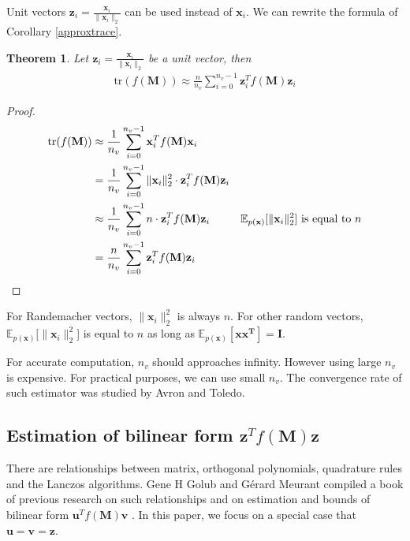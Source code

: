 \documentclass[senior,final,11pt]{iscs-thesis}
\newtheorem{theorem}{Theorem}
\begin{document}
Unit vectors $\mathbf{z}_i = \frac{\mathbf{x}_i}{\|\mathbf{x}_i\|_2}$ can be used instead of $\mathbf{x}_i$. We can rewrite the formula of Corollary \ref{approxtrace}.
\begin{theorem}
    \label{approxtraceUniformed}
    Let $\mathbf{z}_i = \frac{\mathbf{x}_i}{\|\mathbf{x}_i\|_2}$ be a unit vector, then
    \begin{align*}
        \mathrm{tr}(f(\mathbf{M})) \approx \frac{n}{n_v}\sum_{i=0}^{n_v-1} \mathbf{z}_i^{T}f(\mathbf{M})\mathbf{z}_i
    \end{align*}
\end{theorem}
\begin{proof}
    \begin{align*}
        \mathrm{tr}(f(\mathbf{M})) &\approx \frac{1}{n_v}\sum_{i=0}^{n_v-1} \mathbf{x}_i^{T}f(\mathbf{M})\mathbf{x}_i \\
        &= \frac{1}{n_v}\sum_{i=0}^{n_v-1} \|\mathbf{x}_i\|_2^2 \cdot \mathbf{z}_i^{T}f(\mathbf{M})\mathbf{z}_i \\
        &\approx \frac{1}{n_v}\sum_{i=0}^{n_v-1} n \cdot \mathbf{z}_i^{T}f(\mathbf{M})\mathbf{z}_i &\text{$ \mathbb{E}_{p(\mathbf{x})}[\|\mathbf{x}_i\|_2^2$]  is equal to $n$}\\
        &= \frac{n}{n_v}\sum_{i=0}^{n_v-1} \mathbf{z}_i^{T}f(\mathbf{M})\mathbf{z}_i
    \end{align*}
\end{proof}

For Randemacher vectors, $\|\mathbf{x}_i\|_2^2$ is always $n$. For other random vectors, $\mathbb{E}_{p(\mathbf{x})}[\|\mathbf{x}_i\|_2^2$]  is equal to $n$ as long as $\mathbb{E}_{p(\mathbf{x})}[\mathbf{xx^T}] = \mathbf{I}$.

For accurate computation, $n_v$ should approaches infinity. However  using large $n_v$ is expensive. For practical purposes, we can use small $n_v$. The convergence rate of such estimator was studied by Avron and Toledo\cite{avron2011randomized}.


\subsection{Estimation of bilinear form $\mathbf{z}^T f(\mathbf{M}) \mathbf{z}$} \label{bilinear}
There are relationships between matrix, orthogonal polynomials, quadrature rules and the Lanczos algorithms. Gene H Golub and G\'erard Meurant compiled a book of previous research on such relationships and on estimation and bounds of bilinear form $\mathbf{u}^T f(\mathbf{M}) \mathbf{v}$ \cite{golub2009matrices}. In this paper, we focus on a special case that $\mathbf{u}=\mathbf{v}=\mathbf{z}$.
\end{document}
